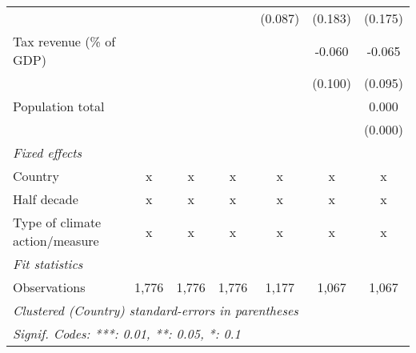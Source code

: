 \begin{tabular}{lcccccc}
                                                        &         &         &               & (0.087)       & (0.183)        & (0.175)\\   
   Tax revenue (\% of GDP)                              &         &         &               &               & -0.060         & -0.065\\   
                                                        &         &         &               &               & (0.100)        & (0.095)\\   
   Population total                                     &         &         &               &               &                & 0.000\\   
                                                        &         &         &               &               &                & (0.000)\\   
   \emph{Fixed effects}\\
   Country                                              & x       & x       & x             & x             & x              & x\\  
   Half decade                                          & x       & x       & x             & x             & x              & x\\  
   Type of climate action/measure                       & x       & x       & x             & x             & x              & x\\  
   \midrule \emph{Fit statistics}\\
   Observations                                         & 1,776   & 1,776   & 1,776         & 1,177         & 1,067          & 1,067\\  
   \midrule
   \multicolumn{7}{l}{\emph{Clustered (Country) standard-errors in parentheses}}\\
   \multicolumn{7}{l}{\emph{Signif. Codes: ***: 0.01, **: 0.05, *: 0.1}}\\
\end{tabular}
\par\endgroup


